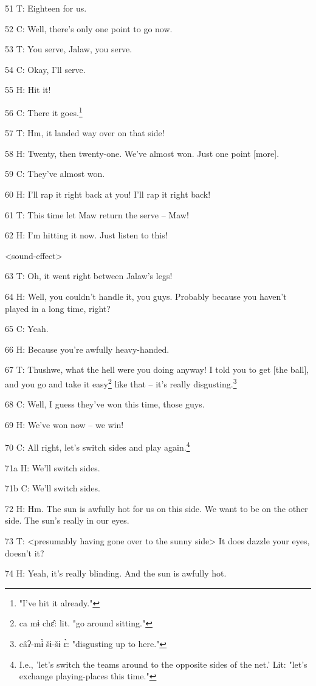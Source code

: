 51 T: Eighteen for us.

52 C: Well, there's only one point to go now.

53 T: You serve, Jalaw, you serve.

54 C: Okay, I'll serve.

55 H: Hit it!

56 C: There it goes.\footnote{"I've hit it already."}

57 T: Hm, it landed way over on that side!

58 H: Twenty, then twenty-one. We've almost won. Just one point [more].

59 C: They've almost won.

60 H: I'll rap it right back at you! I'll rap it right back!

61 T: This time let Maw return the serve -- Maw!

62 H: I'm hitting it now. Just listen to this!

<sound-effect>

63 T: Oh, it went right between Jalaw's legs!

64 H: Well, you couldn't handle it, you guys. Probably because you haven't played
in a long time, right?

65 C: Yeah.

66 H: Because you're awfully heavy-handed.

67 T: Thushwe, what the hell were you doing anyway! I told you to get [the ball],
and you go and take it easy\footnote{ca mɨ chɛ̂:  lit. "go around sitting."} like that -- it's really disgusting.\footnote{câʔ-mɨ̀ šɨ-šɨ ɛ̀: "disgusting up to here."}

68 C: Well, I guess they've won this time, those guys.

69 H: We've won now -- we win!

70 C: All right, let's switch sides and play again.\footnote{I.e., 'let's switch the teams around to the opposite sides of the net.' Lit: "let's exchange playing-places this time."}

71a H: We'll switch sides.

71b C: We'll switch sides.

72 H: Hm. The sun is awfully hot for us on this side. We want to be on the other
side. The sun's really in our eyes.

73 T: <presumably having gone over to the sunny side> It does
dazzle your eyes, doesn't it?

74 H: Yeah, it's really blinding. And the sun is awfully hot.

